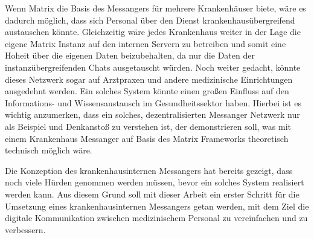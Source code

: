 Wenn Matrix die Basis des Messangers für mehrere Krankenhäuser biete, wäre es dadurch möglich, dass sich Personal über den Dienst krankenhausübergreifend austauschen könnte. Gleichzeitig wäre jedes Krankenhaus weiter in der Lage die eigene Matrix Instanz auf den internen Servern zu betreiben und somit eine Hoheit über die eigenen Daten beizubehalten, da nur die Daten der instanzübergreifenden Chats ausgetauscht würden. Noch weiter gedacht, könnte dieses Netzwerk sogar auf Arztpraxen und andere medizinische Einrichtungen ausgedehnt werden. Ein solches System könnte einen großen Einfluss auf den Informations- und Wissensaustausch im Gesundheitssektor haben. Hierbei ist es wichtig anzumerken, dass ein solches, dezentralisierten Messanger Netzwerk nur als Beispiel und Denkanstoß zu verstehen ist, der demonstrieren soll, was mit einem Krankenhaus Messanger auf Basis des Matrix Frameworks theoretisch technisch möglich wäre. 

Die Konzeption des krankenhausinternen Messangers hat bereits gezeigt, dass noch viele Hürden genommen werden müssen, bevor ein solches System realisiert werden kann. Aus diesem Grund soll mit dieser Arbeit ein erster Schritt für die Umsetzung eines krankenhausinternen Messangers getan werden, mit dem Ziel die digitale Kommunikation zwischen medizinischem Personal zu vereinfachen und zu verbessern. 

